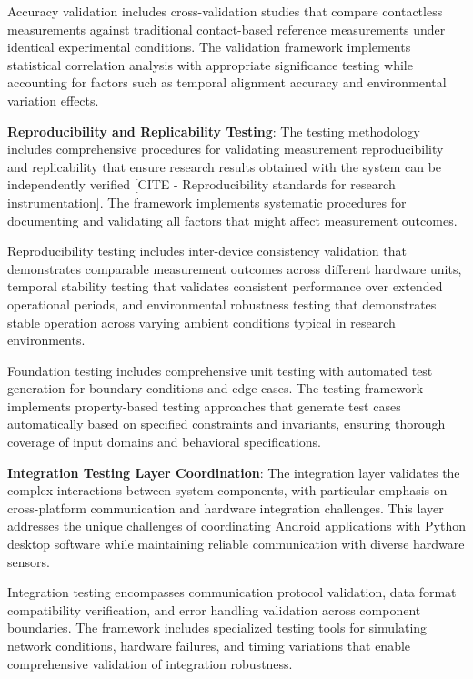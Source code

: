 \documentclass[11pt,a4paper]{report}
\begin{document}
Accuracy validation includes cross-validation studies that compare contactless measurements against traditional
contact-based reference measurements under identical experimental conditions. The validation framework implements
statistical correlation analysis with appropriate significance testing while accounting for factors such as temporal
alignment accuracy and environmental variation effects.

\textbf{Reproducibility and Replicability Testing}: The testing methodology includes comprehensive procedures for validating
measurement reproducibility and replicability that ensure research results obtained with the system can be independently
verified [CITE - Reproducibility standards for research instrumentation]. The framework implements systematic procedures
for documenting and validating all factors that might affect measurement outcomes.

Reproducibility testing includes inter-device consistency validation that demonstrates comparable measurement outcomes
across different hardware units, temporal stability testing that validates consistent performance over extended
operational periods, and environmental robustness testing that demonstrates stable operation across varying ambient
conditions typical in research environments.

Foundation testing includes comprehensive unit testing with automated test generation for boundary conditions and edge
cases. The testing framework implements property-based testing approaches that generate test cases automatically based
on specified constraints and invariants, ensuring thorough coverage of input domains and behavioral specifications.

\textbf{Integration Testing Layer Coordination}: The integration layer validates the complex interactions between system
components, with particular emphasis on cross-platform communication and hardware integration challenges. This layer
addresses the unique challenges of coordinating Android applications with Python desktop software while maintaining
reliable communication with diverse hardware sensors.

Integration testing encompasses communication protocol validation, data format compatibility verification, and error
handling validation across component boundaries. The framework includes specialized testing tools for simulating network
conditions, hardware failures, and timing variations that enable comprehensive validation of integration robustness.
\end{document}
